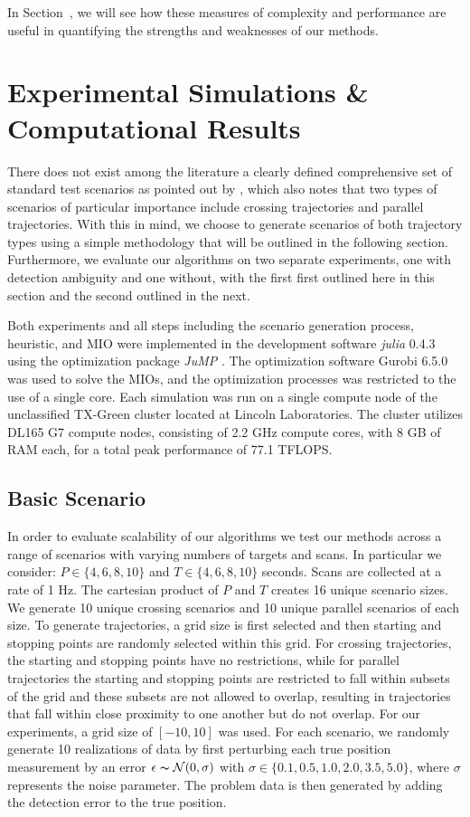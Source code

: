 \documentclass[journal]{IEEEtran}
\begin{document}
In Section~\label{sec:Computational Results}, we will see how these measures of complexity and performance are useful in quantifying the strengths and weaknesses of our methods.

\section{Experimental Simulations \& Computational Results}\label{sec:Results}
There does not exist among the literature a clearly defined comprehensive set of standard test scenarios as pointed out by \cite{MTT-Taxonomy}, which also notes that two types of scenarios of particular importance include crossing trajectories and parallel trajectories. With this in mind, we choose to generate scenarios of both trajectory types using a simple methodology that will be outlined in the following section. Furthermore, we evaluate our algorithms on two separate experiments, one with detection ambiguity and one without, with the first first outlined here in this section and the second outlined in the next. 

Both experiments and all steps including the scenario generation process, heuristic, and MIO were implemented in the development software \textit{julia} 0.4.3 \cite{julia} using the optimization package \textit{JuMP} \cite{JuMP}. The optimization software Gurobi 6.5.0\cite{gurobi} was used to solve the MIOs, and the optimization processes was restricted to the use of a single core. Each simulation was run on a single compute node of the unclassified TX-Green cluster located at Lincoln Laboratories. The cluster utilizes DL165 G7 compute nodes, consisting of 2.2 GHz compute cores, with 8 GB of RAM each, for a total peak performance of 77.1 TFLOPS\cite{LLGrid}. 

\subsection{Basic Scenario}\label{sec:Basic_Results}
In order to evaluate scalability of our algorithms we test our methods across a range of scenarios with varying numbers of targets and scans. In particular we consider: $ P \in \{4,6,8,10\}$ and $T \in \{4,6,8,10\}$ seconds. Scans are collected at a rate of 1 Hz. The cartesian product of $P$ and $T$ creates 16 unique scenario sizes. We generate 10 unique crossing scenarios and 10 unique parallel scenarios of each size. To generate trajectories, a grid size is first selected and then starting and stopping points are randomly selected within this grid. For crossing trajectories, the starting and stopping points have no restrictions, while for parallel trajectories the starting and stopping points are restricted to fall within subsets of the grid and these subsets are not allowed to overlap, resulting in trajectories that fall within close proximity to one another but do not overlap. For our experiments, a grid size of $[-10,10]$ was used. For each scenario, we randomly generate 10 realizations of data by first perturbing each true position measurement by an error $\epsilon \thicksim \mathcal{N}(0,\sigma)$ with $\sigma \in \{0.1,0.5,1.0,2.0,3.5,5.0\}$, where $\sigma$ represents the noise parameter. The problem data is then generated by adding the detection error to the true position.
\end{document}

